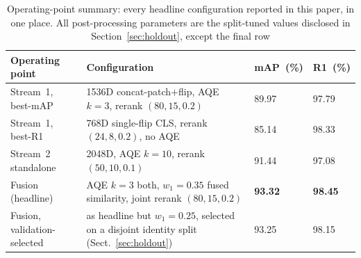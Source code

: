 \begin{table}[!t]
  \centering
  \caption{Operating-point summary: every headline configuration reported in
  this paper, in one place. All post-processing parameters are the split-tuned
  values disclosed in Section~\ref{sec:holdout}, except the final row}
  \label{tab:oppoints}
  \small
  \begin{tabular}{L{3.6cm}L{8.4cm}C{1.4cm}C{1.3cm}}
    \toprule
    Operating point & Configuration & mAP~(\%) & R1~(\%) \\
    \midrule
    Stream~1, best-mAP & 1536D concat-patch$+$flip, AQE $k{=}3$, rerank $(80,15,0.2)$ & 89.97 & 97.79 \\
    Stream~1, best-R1  & 768D single-flip CLS, rerank $(24,8,0.2)$, no AQE & 85.14 & 98.33 \\
    Stream~2 standalone & 2048D, AQE $k{=}10$, rerank $(50,10,0.1)$ & 91.44 & 97.08 \\
    Fusion (headline)  & AQE $k{=}3$ both, $w_1{=}0.35$ fused similarity, joint rerank $(80,15,0.2)$ & \textbf{93.32} & \textbf{98.45} \\
    Fusion, validation-selected & as headline but $w_1{=}0.25$, selected on a disjoint identity split (Sect.~\ref{sec:holdout}) & 93.25 & 98.15 \\
    \bottomrule
  \end{tabular}
\end{table}
